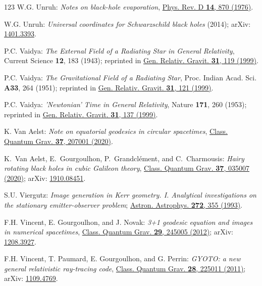 \begin{thebibliography}{123}
W.G. Unruh: {\em Notes on black-hole evaporation},
\href{https://doi.org/10.1103/PhysRevD.14.870}{Phys. Rev. D {\bf 14}, 870 (1976)}.

W.G. Unruh: {\em Universal coordinates for Schwarzschild black holes} (2014);
arXiv: \href{https://arxiv.org/abs/1401.3393}{1401.3393}.

P.C. Vaidya:
{\em The External Field of a Radiating Star in General Relativity},
Current Science {\bf 12}, 183 (1943);
reprinted in \href{https://doi.org/10.1023/A:1018871522880}{Gen. Relativ. Gravit. {\bf 31}, 119 (1999)}.

P.C. Vaidya:
{\em The Gravitational Field of a Radiating Star},
Proc. Indian Acad. Sci. {\bf A33}, 264 (1951);
reprinted in \href{https://doi.org/10.1023/A:1018875606950}{Gen. Relativ. Gravit. {\bf 31}, 121 (1999)}.

P.C. Vaidya:
{\em 'Newtonian' Time in General Relativity},
Nature {\bf 171}, 260 (1953);
reprinted in \href{https://doi.org/10.1023/A:1018827723788}{Gen. Relativ. Gravit. {\bf 31}, 137 (1999)}.

K. Van Aelst: {\em Note on equatorial geodesics in circular spacetimes},
\href{https://doi.org/10.1088/1361-6382/aba80c}{Class. Quantum Grav. {\bf 37}, 207001 (2020)}.

K.~Van Aelst, E.~Gourgoulhon, P.~Grandclément, and C.~Charmousis:
{\em Hairy rotating black holes in cubic Galileon theory},
\href{https://doi.org/10.1088/1361-6382/ab6391}{Class. Quantum Grav. {\bf 37}, 035007 (2020)};
arXiv: \href{https://arxiv.org/abs/1910.08451}{1910.08451}.

S.U. Viergutz:
{\em Image generation in Kerr geometry. I. Analytical investigations on the stationary emitter-observer problem};
\href{https://ui.adsabs.harvard.edu/abs/1993A&A...272..355V}{Astron. Astrophys. {\bf 272}, 355 (1993)}.

F.H. Vincent, E. Gourgoulhon, and J. Novak:
{\em 3+1 geodesic equation and images in numerical spacetimes},
\href{https://doi.org/10.1088/0264-9381/29/24/245005}{Class. Quantum Grav. {\bf 29}, 245005 (2012)};
arXiv: \href{https://arxiv.org/abs/1208.3927}{1208.3927}.

F.H. Vincent, T. Paumard, E. Gourgoulhon, and G. Perrin:
{\em GYOTO: a new general relativistic ray-tracing code},
\href{https://doi.org/10.1088/0264-9381/28/22/225011}{Class. Quantum Grav. {\bf 28}, 225011 (2011)};
arXiv: \href{https://arxiv.org/abs/1109.4769}{1109.4769}.


\end{thebibliography}
